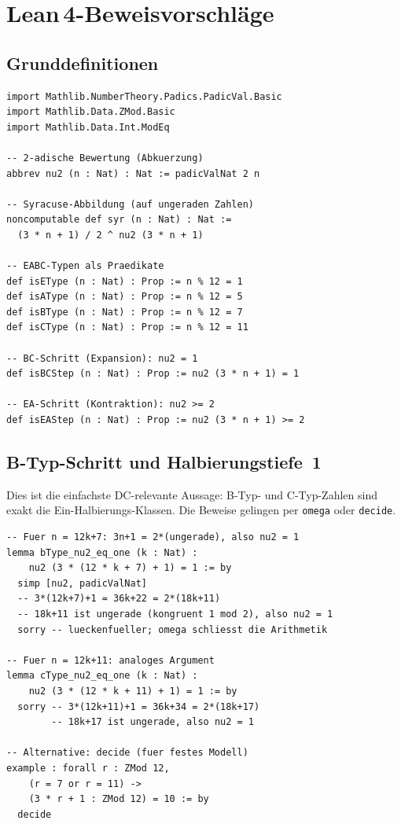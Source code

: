 \documentclass[12pt,a4paper]{article}
\begin{document}
\section{Lean\,4-Beweisvorschläge}
\label{sec:snippets}

\subsection{Grunddefinitionen}

\begin{tcolorbox}[lean]
\begin{lstlisting}
import Mathlib.NumberTheory.Padics.PadicVal.Basic
import Mathlib.Data.ZMod.Basic
import Mathlib.Data.Int.ModEq

-- 2-adische Bewertung (Abkuerzung)
abbrev nu2 (n : Nat) : Nat := padicValNat 2 n

-- Syracuse-Abbildung (auf ungeraden Zahlen)
noncomputable def syr (n : Nat) : Nat :=
  (3 * n + 1) / 2 ^ nu2 (3 * n + 1)

-- EABC-Typen als Praedikate
def isEType (n : Nat) : Prop := n % 12 = 1
def isAType (n : Nat) : Prop := n % 12 = 5
def isBType (n : Nat) : Prop := n % 12 = 7
def isCType (n : Nat) : Prop := n % 12 = 11

-- BC-Schritt (Expansion): nu2 = 1
def isBCStep (n : Nat) : Prop := nu2 (3 * n + 1) = 1

-- EA-Schritt (Kontraktion): nu2 >= 2
def isEAStep (n : Nat) : Prop := nu2 (3 * n + 1) >= 2
\end{lstlisting}
\end{tcolorbox}

\subsection{B-Typ-Schritt und Halbierungstiefe~1}
\label{sec:b-nicht-b}

Dies ist die einfachste DC-relevante Aussage: B-Typ- und C-Typ-Zahlen
sind exakt die Ein-Halbierungs-Klassen. Die Beweise gelingen per
\lstinline|omega| oder \lstinline|decide|.

\begin{tcolorbox}[lean, title={Lean\,4-Code: BC-Schritte sind genau Halbierungstiefe~1}]
\begin{lstlisting}
-- Fuer n = 12k+7: 3n+1 = 2*(ungerade), also nu2 = 1
lemma bType_nu2_eq_one (k : Nat) :
    nu2 (3 * (12 * k + 7) + 1) = 1 := by
  simp [nu2, padicValNat]
  -- 3*(12k+7)+1 = 36k+22 = 2*(18k+11)
  -- 18k+11 ist ungerade (kongruent 1 mod 2), also nu2 = 1
  sorry -- lueckenfueller; omega schliesst die Arithmetik

-- Fuer n = 12k+11: analoges Argument
lemma cType_nu2_eq_one (k : Nat) :
    nu2 (3 * (12 * k + 11) + 1) = 1 := by
  sorry -- 3*(12k+11)+1 = 36k+34 = 2*(18k+17)
        -- 18k+17 ist ungerade, also nu2 = 1

-- Alternative: decide (fuer festes Modell)
example : forall r : ZMod 12,
    (r = 7 or r = 11) ->
    (3 * r + 1 : ZMod 12) = 10 := by
  decide
\end{lstlisting}
\end{tcolorbox}
\end{document}
